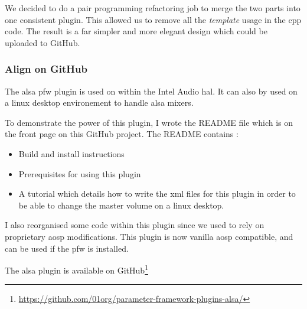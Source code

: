 We decided to do a pair programming refactoring job to merge the two parts into one consistent plugin.
This allowed us to remove all the \emph{template} usage in the \gls{cpp} code.
The result is a far simpler and more elegant design which could be uploaded to \gls{GitHub}.

\subsubsection{Align on GitHub}
The \gls{alsa} \gls{pfw} plugin is used on within the Intel Audio \gls{hal}. It can also by used
on a linux desktop environement to handle \gls{alsa} mixers.

To demonstrate the power of this plugin, I wrote the README file which is on the
front page on this \gls{GitHub} project.  The README contains :
\begin{itemize}
    \item Build and install instructions
    \item Prerequisites for using this plugin
    \item A tutorial which details how to write the \gls{xml} files for this
    plugin in order to be able to change the master volume on a linux desktop.
\end{itemize}
I also reorganised some code within this plugin since we used to rely on proprietary \gls{aosp} modifications.
This plugin is now vanilla \gls{aosp} compatible, and can be used if the \gls{pfw} is installed.

The \gls{alsa} plugin is available on \gls{GitHub}\footnote{\url{https://github.com/01org/parameter-framework-plugins-alsa/}}
